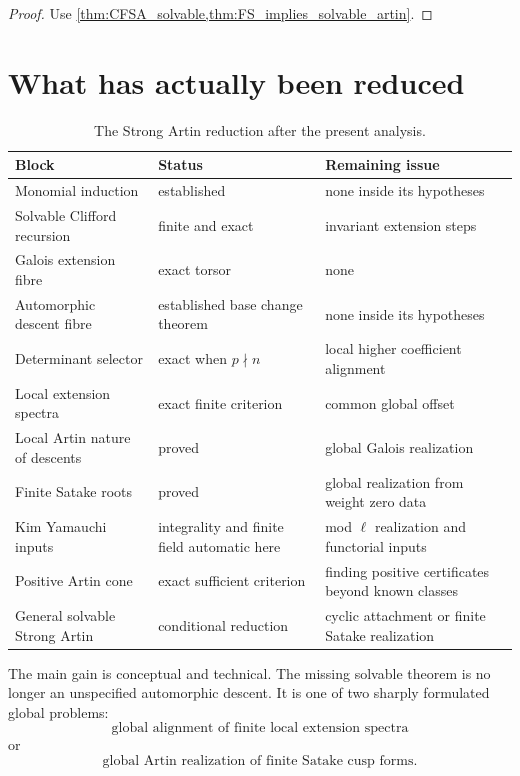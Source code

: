 \documentclass{aomart}
\theoremstyle{definition}
\theoremstyle{remark}
\begin{document}
\begin{proof}
Use \cref{thm:CFSA_solvable,thm:FS_implies_solvable_artin}.
\end{proof}

\section{What has actually been reduced}\label{sec:reduction_ledger}

\begin{table}[t]
\centering
\caption{The Strong Artin reduction after the present analysis.}
\label{tab:reduction_ledger}
\begin{tabular}{>{\raggedright\arraybackslash}p{}>{\raggedright\arraybackslash}p{}>{\raggedright\arraybackslash}p{}}
\toprule
Block & Status & Remaining issue\\
\midrule
Monomial induction & established & none inside its hypotheses\\
Solvable Clifford recursion & finite and exact & invariant extension steps\\
Galois extension fibre & exact torsor & none\\
Automorphic descent fibre & established base change theorem & none inside its hypotheses\\
Determinant selector & exact when \(p\nmid n\) & local higher coefficient alignment\\
Local extension spectra & exact finite criterion & common global offset\\
Local Artin nature of descents & proved & global Galois realization\\
Finite Satake roots & proved & global realization from weight zero data\\
Kim Yamauchi inputs & integrality and finite field automatic here & mod \(\ell\) realization and functorial inputs\\
Positive Artin cone & exact sufficient criterion & finding positive certificates beyond known classes\\
General solvable Strong Artin & conditional reduction & cyclic attachment or finite Satake realization\\
\bottomrule
\end{tabular}
\end{table}

The main gain is conceptual and technical. The missing solvable theorem is no longer an unspecified automorphic descent. It is one of two sharply formulated global problems:
\[
 \boxed{
 \text{global alignment of finite local extension spectra}
 }
\]
or
\[
 \boxed{
 \text{global Artin realization of finite Satake cusp forms}.
 }
\]
\end{document}
